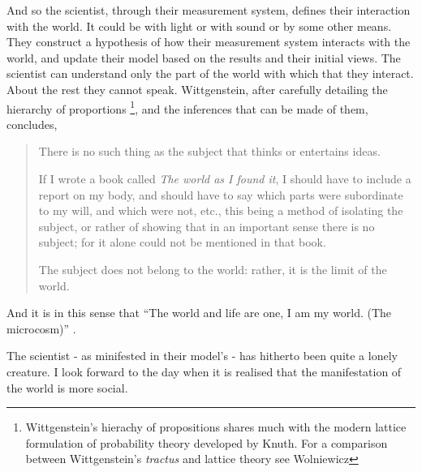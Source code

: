 And so the scientist, through their measurement system, 
defines their interaction with the world.  
It could be with light or with sound or by some other means.  
They construct a hypothesis of how their measurement system interacts with the world,
and update their model based on the results and their initial views.
The scientist can understand only the part of the world with which that they interact.
About the rest they cannot speak.
Wittgenstein\cite{WittgensteinBook}, after  carefully detailing the hierarchy of proportions%
\footnote{
Wittgenstein's hierachy of propositions shares much with the modern lattice 
formulation of probability theory developed by Knuth\cite{Knuth2005a, Knuth2012}.
For a  comparison between Wittgenstein's {\em tractus} and lattice theory see Wolniewicz\cite{WolniewiczBook} 
}, and the inferences that can be made of them,
concludes,
\begin{quote}
 There is no such thing as the subject that thinks or entertains
 ideas.

 If I wrote a book called {\em The world as I found it},
 I should have to include a report on my body, and should have to say
 which parts were subordinate to my will,
 and which were not, etc., this being a method of isolating the subject,
 or rather of showing that in an important sense there is no subject;
 for it alone could not be mentioned in that book.

 The subject does not belong to the world: rather, it is the limit of
 the world. 
\end{quote}
And it is in this sense that
 ``The world and life are one, I am my world. (The microcosm)'' \cite{WittgensteinBook}.

The scientist - as minifested in their model's - has hitherto been quite a lonely creature.
I look forward to the day when it is realised that the manifestation of the world is more social.  



